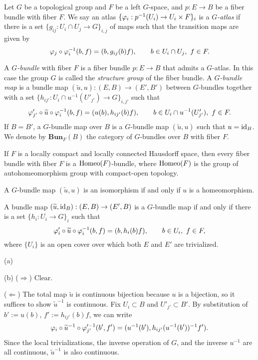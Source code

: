 \documentclass{../../large}
\begin{document}
\begin{prb}
Let $G$ be a topological group and $F$ be a left $G$-space, and $p:E\to B$ be a fiber bundle with fiber $F$.
We say an atlas $\{\varphi_i:p^{-1}(U_i)\to U_i\times F\}_i$ is a \emph{$G$-atlas} if there is a set $\{g_{ij}:U_i\cap U_j\to G\}_{i,j}$ of maps such that the transition maps are given by
\[\varphi_j\circ\varphi_i^{-1}(b,f)=(b,g_{ij}(b)f),
\qquad b\in U_i\cap U_j,\ f\in F.\]

A \emph{$G$-bundle} with fiber $F$ is a fiber bundle $p:E\to B$ that admits a $G$-atlas.
In this case the group $G$ is called the \emph{structure group} of the fiber bundle.
A \emph{$G$-bundle map} is a bundle map $(\tilde u,u):(E,B)\to(E',B')$ between $G$-bundles together with a set $\{h_{ij'}:U_i\cap u^{-1}(U'_{j'})\to G\}_{i,j'}$ such that
\[\varphi'_{j'}\circ\widetilde u\circ \varphi_i^{-1}(b,f)=(u(b),h_{ij'}(b)f),
\qquad b\in U_i\cap u^{-1}(U'_{j'}),\ f\in F.\]
If $B=B'$, a $G$-bundle map over $B$ is a $G$-bundle map $(\tilde u,u)$ such that $u=\operatorname{id}_B$.
We denote by $\mathbf{Bun}_F(B)$ the category of $G$-bundles over $B$ with fiber $F$.
\begin{parts}
\item If $F$ is a locally compact and locally connected Hausdorff space, then every fiber bundle with fiber $F$ is a $\operatorname{Homeo}(F)$-bundle, where $\operatorname{Homeo}(F)$ is the group of autohomeomorphism group with compact-open topology.
\item A $G$-bundle map $(\tilde u,u)$ is an isomorphism if and only if $u$ is a homeomorphism.
\item A bundle map $(\widetilde u,\operatorname{id}_B):(E,B)\to(E',B)$ is a $G$-bundle map if and only if there is a set $\{h_i:U_i\to G\}_i$ such that
\[\varphi_i'\circ\widetilde u\circ\varphi_i^{-1}(b,f)=(b,h_i(b)f),
\qquad b\in U_i,\ f\in F,\]
where $\{U_i\}$ is an open cover over which both $E$ and $E'$ are trivialized.
\end{parts}
\end{prb}
\begin{pf}
(a)

(b)
($\Rightarrow$)
Clear.

($\Leftarrow$)
The total map $\tilde u$ is continuous bijection because $u$ is a bijection, so it suffices to show $\tilde u^{-1}$ is continuous.
Fix $U_i\subset B$ and $U'_{j'}\subset B'$.
By substitution of $b':=u(b)$, $f':=h_{ij'}(b)f$, we can write
\[\varphi_i\circ\widetilde u^{-1}\circ\varphi_{j'}'^{-1}(b',f')=(u^{-1}(b'),h_{ij'}(u^{-1}(b'))^{-1}f').\]
Since the local trivializations, the inverse operation of $G$, and the inverse $u^{-1}$ are all continuous, $\tilde u^{-1}$ is also continuous.
\end{pf}
\end{document}
